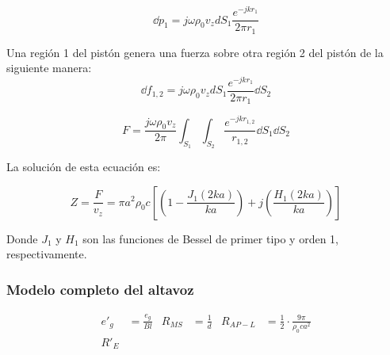 \documentclass[12pt, a4paper]{article}
\begin{document}
\begin{equation} \label{eq:incremento_presion}
    \dd p_1 = j\omega\rho_0 v_z d S_1 \frac{e^{-jkr_1}}{2\pi r_1}
\end{equation}

Una región 1 del pistón genera una fuerza sobre otra región 2 del pistón de la siguiente manera: 
\begin{equation} \label{eq:presion_de_1_sobre_2}
    \dd f_{1,2} = j\omega \rho_0 v_z d S_1 \frac{e^{-jkr_1}}{2\pi r_1} \dd S_2
\end{equation}

\begin{equation} \label{eq:presion_de_2_sobre_1}
    F = \frac{j\omega \rho_0 v_z}{2\pi} \int_{S_1} \int_{S_2} \frac{e^{-jkr_{1,2}}}{r_{1,2}} \dd S_1 \dd S_2    
\end{equation}

La solución de esta ecuación es:

\begin{equation} \label{eq:impedancia_piston}
    Z = \frac{F}{v_z} = \pi a^2 \rho_0 c \left[ \left( 1 - \frac{J_1 (2ka)}{ka}  \right) + j \left( \frac{H_1 (2ka)}{ka} \right)\right]
\end{equation}

Donde $J_1$ y $H_1$ son las funciones de Bessel de primer tipo y orden 1, respectivamente.

\subsubsection{Modelo completo del altavoz}

\begin{align*}
    e'_g &= \frac{e_g}{Bl} & R_{MS} &= \frac{1}{d} & R_{AP-L} &= \frac{1}{2} \cdot \frac{9\pi}{\rho_0ca^2} \\
    R'_E 
\end{align*}
\end{document}
